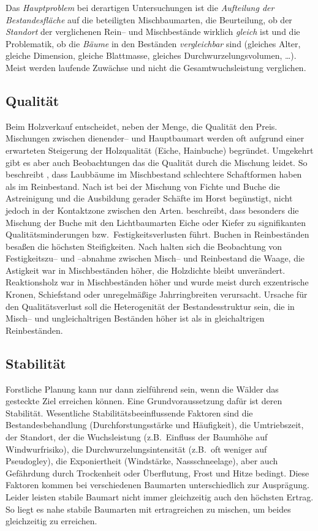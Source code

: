 \documentclass[twocolumn]{scrartcl}
\begin{document}
Das \emph{Hauptproblem} bei derartigen Untersuchungen ist die
\emph{Aufteilung der Bestandesfläche} auf die beteiligten
Mischbaumarten, die Beurteilung, ob der \emph{Standort} der
verglichenen Rein-- und Mischbestände wirklich \emph{gleich} ist und
die Problematik, ob die \emph{Bäume} in den Beständen
\emph{vergleichbar} sind (gleiches Alter, gleiche Dimension, gleiche
Blattmasse, gleiches Durchwurzelungsvolumen, \dots). Meist werden
laufende Zuwächse und nicht die Gesamtwuchsleistung verglichen.

\subsection{Qualität}
\label{ssec:qualitaet}

Beim Holzverkauf entscheidet, neben der Menge, die Qualität den
Preis. Mischungen zwischen dienender-- und Hauptbaumart werden oft
aufgrund einer erwarteten Steigerung der Holzqualität (Eiche,
Hainbuche) begründet. Umgekehrt gibt es aber auch Beobachtungen das
die Qualität durch die Mischung leidet. So beschreibt
\cite{burger1925plenterwald}, dass Laubbäume im Mischbestand
schlechtere Schaftformen haben als im Reinbestand. Nach
\cite{tiebel2016qualitaet} ist bei der Mischung von Fichte und Buche
die Astreinigung und die Ausbildung gerader Schäfte im Horst
begünstigt, nicht jedoch in der Kontaktzone zwischen den
Arten. \cite{rais2019MischungQualitaet} beschreibt, dass besonders die
Mischung der Buche mit den Lichtbaumarten Eiche oder Kiefer zu
signifikanten Qualitätsminderungen bzw.\ Festigkeitsverlusten
führt. Buchen in Reinbeständen besaßen die höchsten
Steifigkeiten. Nach \cite{pretzsch2016holzqualitaetMischRein} halten
sich die Beobachtung von Festigkeitszu-- und --abnahme zwischen
Misch-- und Reinbestand die Waage, die Astigkeit war in Mischbeständen
höher, die Holzdichte bleibt unverändert. Reaktionsholz war in
Mischbeständen höher und wurde meist durch exzentrische Kronen,
Schiefstand oder unregelmäßige Jahrringbreiten verursacht. Ursache für
den Qualitätsverlust soll die Heterogenität der Bestandesstruktur
sein, die in Misch-- und ungleichaltrigen Beständen höher ist als in
gleichaltrigen Reinbeständen.

\subsection{Stabilität}
\label{ssec:stabilitaet}

Forstliche Planung kann nur dann zielführend sein, wenn die Wälder das gesteckte
Ziel erreichen können. Eine Grundvoraussetzung dafür ist deren Stabilität.
Wesentliche Stabilitätsbeeinflussende Faktoren sind die Bestandesbehandlung
(Durchforstungsstärke und Häufigkeit), die Umtriebszeit, der Standort, der die
Wuchsleistung (z.B.\ Einfluss der Baumhöhe auf Windwurfrisiko), die
Durchwurzelungsintensität (z.B.\ oft weniger auf Pseudogley), die Exponiertheit
(Windstärke, Nassschneelage), aber auch Gefährdung durch Trockenheit oder
Überflutung, Frost und Hitze bedingt. Diese Faktoren kommen bei verschiedenen
Baumarten unterschiedlich zur Ausprägung. Leider leisten stabile Baumart nicht
immer gleichzeitig auch den höchsten Ertrag. So liegt es nahe stabile Baumarten
mit ertragreichen zu mischen, um beides gleichzeitig zu erreichen.
\end{document}
